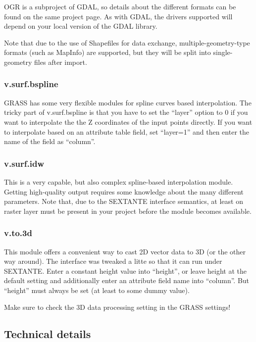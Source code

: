 OGR is a subproject of GDAL, so details about the different formats can be found on the same project page. As with GDAL, the drivers supported will depend on your local version of the GDAL library.

Note that due to the use of Shapefiles for data exchange, multiple-geometry-type formats (such as MapInfo) are supported, but they will be split into single-geometry files after import.


\subsubsection{v.surf.bspline}

GRASS has some very flexible modules for spline curves based interpolation. The tricky part of v.surf.bspline is that you have to set the ``layer'' option to 0 if you want to interpolate the the Z coordinates of the input points directly. If you want to interpolate based on an attribute table field, set ``layer=1'' and then enter the name of the field as ``column''.

\subsubsection{v.surf.idw}

This is a very capable, but also complex spline-based interpolation module. Getting high-quality output requires some knowledge about the many different parameters. Note that, due to the SEXTANTE interface semantics, at least on raster layer must be present in your project before the module becomes available.

\subsubsection{v.to.3d}

This module offers a convenient way to cast 2D vector data to 3D (or the other way around). The interface was tweaked a litte so that it can run under SEXTANTE. Enter a constant height value into ``height'', or leave height at the default setting and additionally enter an attribute field name into ``column''. But ``height'' must always be set (at least to some dummy value).

Make sure to check the 3D data processing setting in the GRASS settings!

\subsection{Technical details}

